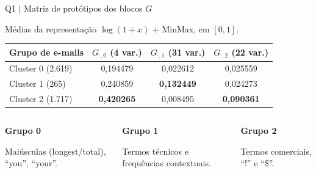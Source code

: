 \documentclass[aspectratio=169,11pt]{beamer}
\begin{document}
\begin{frame}[t]{Q1 | Matriz de protótipos dos blocos $G$}

\small Médias da representação $\log(1+x)$ + MinMax, em $[0,1]$.\vspace{2mm}
\par
\small
\renewcommand{\arraystretch}{1.65}
\setlength{\tabcolsep}{4pt}
\centering
\begin{tabular}{lccc}
\toprule
Grupo de e-mails & $G_{\cdot,0}$ (4 var.) & $G_{\cdot,1}$ (31 var.) & $G_{\cdot,2}$ (22 var.) \\
\midrule
Cluster 0 (2.619) & 0,194479 & 0,022612 & 0,025559 \\
Cluster 1 (265) & 0,240859 & \textbf{0,132449} & 0,024273 \\
Cluster 2 (1.717) & \textbf{0,420265} & 0,008495 & \textbf{0,090361} \\
\bottomrule
\end{tabular}
\par
\vspace{3mm}
\begin{columns}[T,onlytextwidth]
\begin{simplebox}\scriptsize \textbf{Grupo 0}\par Maiúsculas (longest/total), ``you'', ``your''.\end{simplebox}
\begin{simplebox}\scriptsize \textbf{Grupo 1}\par Termos técnicos e frequências contextuais.\end{simplebox}
\begin{simplebox}\scriptsize \textbf{Grupo 2}\par Termos comerciais, ``!'' e ``\$''.\end{simplebox}
\end{columns}

\end{frame}
\end{document}
